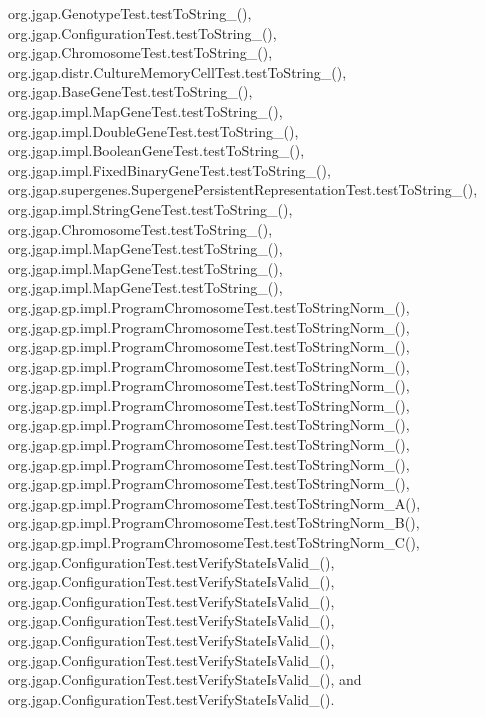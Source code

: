 org.\-jgap.\-Genotype\-Test.\-test\-To\-String\-\_(), org.\-jgap.\-Configuration\-Test.\-test\-To\-String\-\_(), org.\-jgap.\-Chromosome\-Test.\-test\-To\-String\-\_(), org.\-jgap.\-distr.\-Culture\-Memory\-Cell\-Test.\-test\-To\-String\-\_(), org.\-jgap.\-Base\-Gene\-Test.\-test\-To\-String\-\_(), org.\-jgap.\-impl.\-Map\-Gene\-Test.\-test\-To\-String\-\_(), org.\-jgap.\-impl.\-Double\-Gene\-Test.\-test\-To\-String\-\_(), org.\-jgap.\-impl.\-Boolean\-Gene\-Test.\-test\-To\-String\-\_(), org.\-jgap.\-impl.\-Fixed\-Binary\-Gene\-Test.\-test\-To\-String\-\_(), org.\-jgap.\-supergenes.\-Supergene\-Persistent\-Representation\-Test.\-test\-To\-String\-\_(), org.\-jgap.\-impl.\-String\-Gene\-Test.\-test\-To\-String\-\_(), org.\-jgap.\-Chromosome\-Test.\-test\-To\-String\-\_(), org.\-jgap.\-impl.\-Map\-Gene\-Test.\-test\-To\-String\-\_(), org.\-jgap.\-impl.\-Map\-Gene\-Test.\-test\-To\-String\-\_(), org.\-jgap.\-impl.\-Map\-Gene\-Test.\-test\-To\-String\-\_(), org.\-jgap.\-gp.\-impl.\-Program\-Chromosome\-Test.\-test\-To\-String\-Norm\-\_(), org.\-jgap.\-gp.\-impl.\-Program\-Chromosome\-Test.\-test\-To\-String\-Norm\-\_(), org.\-jgap.\-gp.\-impl.\-Program\-Chromosome\-Test.\-test\-To\-String\-Norm\-\_(), org.\-jgap.\-gp.\-impl.\-Program\-Chromosome\-Test.\-test\-To\-String\-Norm\-\_(), org.\-jgap.\-gp.\-impl.\-Program\-Chromosome\-Test.\-test\-To\-String\-Norm\-\_(), org.\-jgap.\-gp.\-impl.\-Program\-Chromosome\-Test.\-test\-To\-String\-Norm\-\_(), org.\-jgap.\-gp.\-impl.\-Program\-Chromosome\-Test.\-test\-To\-String\-Norm\-\_(), org.\-jgap.\-gp.\-impl.\-Program\-Chromosome\-Test.\-test\-To\-String\-Norm\-\_(), org.\-jgap.\-gp.\-impl.\-Program\-Chromosome\-Test.\-test\-To\-String\-Norm\-\_(), org.\-jgap.\-gp.\-impl.\-Program\-Chromosome\-Test.\-test\-To\-String\-Norm\-\_(), org.\-jgap.\-gp.\-impl.\-Program\-Chromosome\-Test.\-test\-To\-String\-Norm\-\_\-\-A(), org.\-jgap.\-gp.\-impl.\-Program\-Chromosome\-Test.\-test\-To\-String\-Norm\-\_\-\-B(), org.\-jgap.\-gp.\-impl.\-Program\-Chromosome\-Test.\-test\-To\-String\-Norm\-\_\-\-C(), org.\-jgap.\-Configuration\-Test.\-test\-Verify\-State\-Is\-Valid\-\_(), org.\-jgap.\-Configuration\-Test.\-test\-Verify\-State\-Is\-Valid\-\_(), org.\-jgap.\-Configuration\-Test.\-test\-Verify\-State\-Is\-Valid\-\_(), org.\-jgap.\-Configuration\-Test.\-test\-Verify\-State\-Is\-Valid\-\_(), org.\-jgap.\-Configuration\-Test.\-test\-Verify\-State\-Is\-Valid\-\_(), org.\-jgap.\-Configuration\-Test.\-test\-Verify\-State\-Is\-Valid\-\_(), org.\-jgap.\-Configuration\-Test.\-test\-Verify\-State\-Is\-Valid\-\_(), and org.\-jgap.\-Configuration\-Test.\-test\-Verify\-State\-Is\-Valid\-\_().

